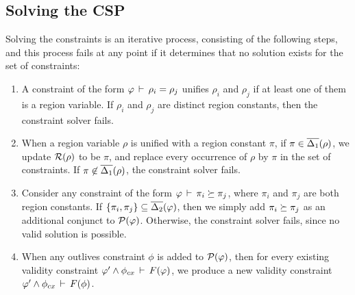 \subsection{Solving the CSP}

Solving the constraints is an iterative process, consisting of the following
steps, and this process fails at any point if it determines that no solution
exists for the set of constraints:

\begin{enumerate}

\item
    A constraint of the form $\varphi\,\vdash\,\rho_i = \rho_j$ unifies
$\rho_i$ and $\rho_j$ if at least one of them is a region variable.
If $\rho_i$ and $\rho_j$ are distinct region constants, then the constraint
solver fails.

\item
When a region variable $\rho$ is unified with a region constant $\pi$,
if $\pi \in \overline{\Delta_1}(\rho)$, we update $\mathcal{R}(\rho)$ to be $\pi$,
and replace every occurrence of $\rho$ by $\pi$ in the set of constraints.
If $\pi \not\in \overline{\Delta_1}(\rho)$, the constraint solver fails.

\item
Consider any constraint of the form $\varphi\,\vdash\,\pi_i \succeq \pi_j$,
where $\pi_i$ and $\pi_j$ are both region constants.
If $\{ \pi_i, \pi_j \} \subseteq \overline{\Delta_2}(\varphi)$, then we simply add
$\pi_i \succeq \pi_j$ as an additional conjunct to $\mathcal{P}(\varphi)$.
Otherwise, the constraint solver fails, since no valid solution is possible.

\item
  When any outlives constraint $\phi$ is added to $\mathcal{P}(\varphi)$,
  then for every existing validity constraint $\varphi' \wedge \phi_{cx}\,\vdash\,F(\varphi)$,
  we produce a new validity constraint $\varphi' \wedge \phi_{cx}\,\vdash\,F(\phi)$. 

\end{enumerate}


